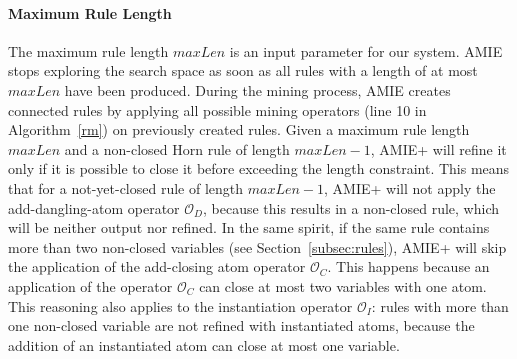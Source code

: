 \paragraph{Maximum Rule Length}
%
The maximum rule length $maxLen$ is an input parameter for our system. AMIE stops exploring the search space as soon as all rules with
a length of at most $maxLen$ have been produced.
During the mining process, AMIE creates connected rules by applying all possible mining operators
(line 10 in Algorithm~\ref{rm}) on previously created rules.
Given a maximum rule length $maxLen$ and a non-closed Horn rule of length $maxLen-1$, AMIE+
will refine it only if it is possible to close it before exceeding the length constraint.
This means that for a not-yet-closed rule of length $maxLen-1$, AMIE+ will not apply
the add-dangling-atom operator $\mathcal{O}_D$, because this results in a non-closed rule,
which will be neither output nor refined. In the same spirit, if the same rule contains more than
two non-closed variables (see Section~\ref{subsec:rules}), AMIE+ will skip the application of
the add-closing atom operator $\mathcal{O}_C$. This happens because an application of the operator
$\mathcal{O}_C$ can close at most two variables with one atom.
This reasoning also applies to the instantiation operator $\mathcal{O}_I$:
rules with more than one non-closed variable are not refined with instantiated atoms,
because the addition of an instantiated atom can close at most one variable.

